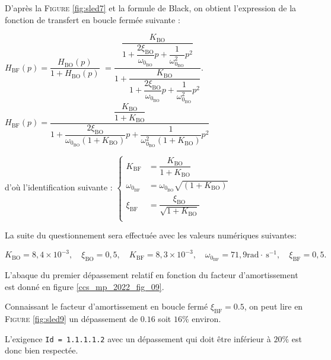 \ifprof
\begin{corrige}
D'après la \textsc{Figure} \ref{fig:sled7} et la formule de Black, on obtient l'expression de la fonction de transfert en boucle fermée suivante :

$H_\text{BF}(p)  = \dfrac{H_\text{BO}(p)}{1 + H_\text{BO}(p)}$
 $ = \dfrac{\dfrac{K_\text{BO}}{1+\dfrac{2 \xi_\text{BO}}{\omega_{0_\text{BO}}}p + \dfrac{1}{\omega^2_{0_\text{BO}}}p^2} }{1 + \dfrac{K_\text{BO}}{1+\dfrac{2 \xi_\text{BO}}{\omega_{0_\text{BO}}}p + \dfrac{1}{\omega^2_{0_\text{BO}}}p^2} }$.
$H_\text{BF}(p)   = \dfrac{\dfrac{K_\text{BO}}{1+K_\text{BO}}}{ 1 + \dfrac{2 \xi_\text{BO}}{\omega_{0_\text{BO}} (1 + K_\text{BO})}p + \dfrac{1}{\omega^2_{0_\text{BO}}(1 + K_\text{BO})}p^2}$

d'où l'identification suivante :
$
\left\{  
\begin{array}{ll}
K_\text{BF} &= \dfrac{K_\text{BO}}{1+K_\text{BO}} \\
\omega_{0_{\text{BF}}} &= \omega_{0_\text{BO}} \sqrt{(1 + K_\text{BO})} \\
\xi_\text{BF} &= \dfrac{\xi_\text{BO}}{\sqrt{1 + K_\text{BO}}}\\
\end{array}
\right.
$


\end{corrige}
\else
\fi

\ifprof
\else
La suite du questionnement sera effectuée avec les valeurs numériques suivantes:

$$
K_{\mathrm{BO}}=8,4 \times 10^{-3}, \quad \xi_{\mathrm{BO}}=0,5, \quad K_{\mathrm{BF}}=8,3 \times 10^{-3}, \quad \omega_{0_{\mathrm{BF}}}=71,9 \mathrm{rad} \cdot \mathrm{~s}^{-1}, \quad \xi_{\mathrm{BF}}=0,5 .
$$

L'abaque du premier dépassement relatif en fonction du facteur d'amortissement est donné en figure \ref{ccs_mp_2022_fig_09}.
\fi

\ifprof
\begin{corrige}
Connaissant le facteur d'amortissement en boucle fermé $\xi_\text{BF} = 0.5$, on peut lire en \textsc{Figure} \ref{fig:sled9} un dépassement de $0.16$ soit $16\%$ environ.

L'exigence \texttt{Id = 1.1.1.1.2} avec un dépassement qui doit être inférieur à $20\%$ est donc bien respectée.

\end{corrige}
\else
\fi


